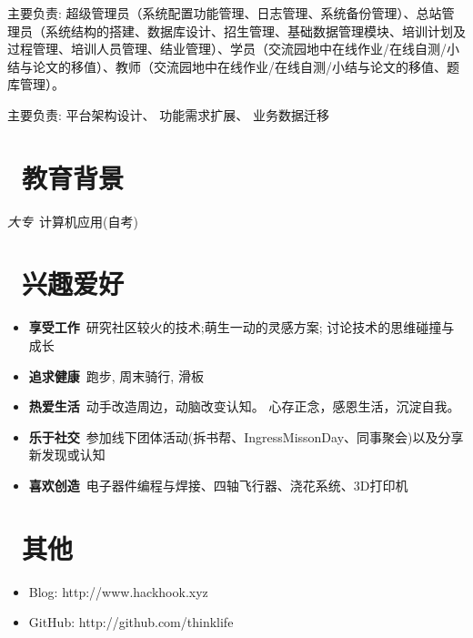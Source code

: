 \documentclass{resume}
\begin{document}
\begin{onehalfspacing}
主要负责:
超级管理员（系统配置功能管理、日志管理、系统备份管理）、总站管理员（系统结构的搭建、数据库设计、招生管理、基础数据管理模块、培训计划及过程管理、培训人员管理、结业管理）、学员（交流园地中在线作业/在线自测/小结与论文的移值）、教师（交流园地中在线作业/在线自测/小结与论文的移值、题库管理）。
\end{onehalfspacing}

\begin{onehalfspacing}
主要负责:
平台架构设计、 功能需求扩展、 业务数据迁移
\end{onehalfspacing}

\section{\faGraduationCap\  教育背景}
\textit{大专}\ 计算机应用(自考)

\section{\faHeart\ 兴趣爱好}
\begin{itemize}[parsep=0.5ex]
  \item \textbf{享受工作}\ 研究社区较火的技术;萌生一动的灵感方案; 讨论技术的思维碰撞与成长
  \item \textbf{追求健康}\ 跑步, 周末骑行, 滑板
  \item \textbf{热爱生活}\ 动手改造周边，动脑改变认知。 心存正念，感恩生活，沉淀自我。
  \item \textbf{乐于社交}\ 参加线下团体活动(拆书帮、IngressMissonDay、同事聚会)以及分享新发现或认知
  \item \textbf{喜欢创造}\ 电子器件编程与焊接、四轴飞行器、浇花系统、3D打印机
\end{itemize}

\section{\faInfo\ 其他}
\begin{itemize}[parsep=0.5ex]
  \item Blog: http://www.hackhook.xyz
  \item GitHub: http://github.com/thinklife
\end{itemize}
\end{document}
